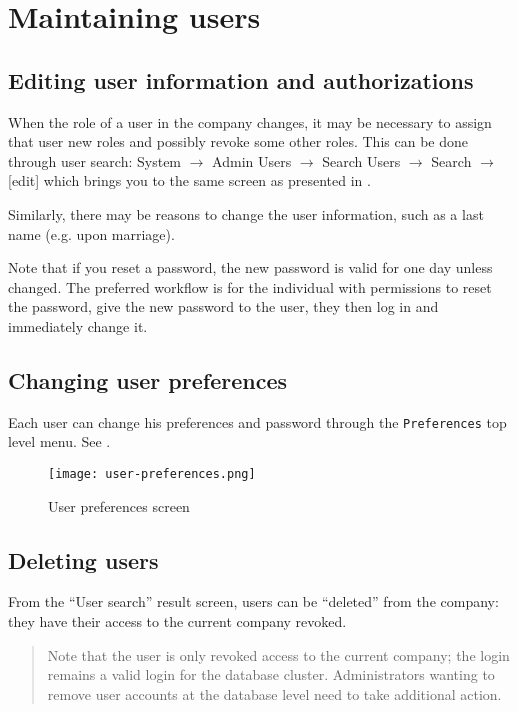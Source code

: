 \section{Maintaining users}

\subsection{Editing user information and authorizations}

When the role of a user in the company changes, it may be necessary to assign
that user new roles and possibly revoke some other roles. This can be done through
user search: System $\rightarrow$ Admin Users $\rightarrow$ Search Users $\rightarrow$ Search $\rightarrow$ {[}edit] which brings you to the same screen as presented in
.

Similarly, there may be reasons to change the user information, such as a last name
(e.g. upon marriage).

Note that if you reset a password, the new password is valid for one day unless
changed.  The preferred workflow is for the individual with permissions to reset
the password, give the new password to the user, they then log in and
immediately change it.

\subsection{Changing user preferences}

Each user can change his preferences and password through the \texttt{Preferences}
top level menu. See .

\begin{figure}[h]
\centering
\texttt{[image: user-preferences.png]}
\caption{User preferences screen}
\label{fig:user-preferences}
\end{figure}


\subsection{Deleting users}

From the ``User search'' result screen, users can be ``deleted'' from the company:
they have their access to the current company revoked.

\begin{quotation}
Note that the user is only revoked access to the current company; the login remains a valid
login for the database cluster. Administrators wanting to remove user accounts at the database
level need to take additional action.
\end{quotation}


